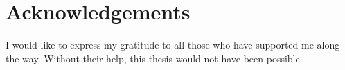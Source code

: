 \chapter*{Acknowledgements}

I would like to express my gratitude to all those who have supported me along the way. Without their help, this thesis would not have been possible.

\lipsum[1]